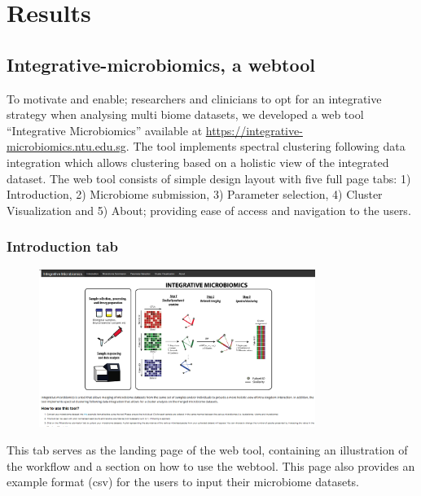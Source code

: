 \section{Results}

\subsection{Integrative-microbiomics, a webtool}

To motivate and enable; researchers and clinicians to opt for an integrative strategy when analysing multi biome datasets, we developed a web tool “Integrative Microbiomics” available at  \url{https://integrative-microbiomics.ntu.edu.sg}. The tool implements spectral clustering following data integration which allows clustering based on a holistic view of the integrated dataset. The web tool consists of simple design layout with five full page tabs: 1) Introduction, 2) Microbiome submission, 3) Parameter selection, 4) Cluster Visualization and 5) About; providing ease of access and navigation to the users.
\subsubsection{Introduction tab}
\begin{figure}[H]
	\centering
	\includegraphics[width=0.8\textwidth]{image/Introduction_tab.PNG}
\end{figure}
This tab serves as the landing page of the web tool, containing an illustration of the workflow and a section on how to use the webtool. This page also provides an example format (csv) for the users to input their microbiome datasets.

